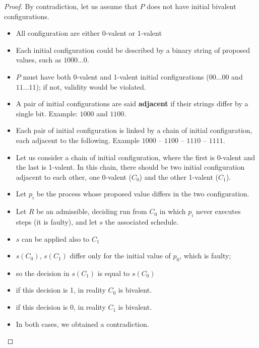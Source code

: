\documentclass[12pt]{article}
\newcommand{\BI}{\begin{itemize}}
\newcommand{\EI}{\end{itemize}}
\begin{document}
\begin{proof}
By contradiction, let us assume that $P$ does not have initial
bivalent configurations.

\BI
\item All configuration are either 0-valent or 1-valent

\item
Each initial configuration could be described by a binary string of proposed
values, such as $1000\ldots0$.

\item 
$P$ must have both 0-valent and 1-valent initial configurations ($00\ldots00$ and
$11\ldots11$); if not, validity would be violated.


\item 
A pair of initial configurations are said {\bf adjacent} if their strings differ
by a single bit. Example: $1000$ and $1100$.

\item
Each pair of initial configuration is linked by a chain of initial configuration, each adjacent
to the following. Example $1000$ -- $1100$ -- $1110$ -- $1111$.

\item Let us consider a chain of initial configuration, where the first is 
  0-valent and the last is 1-valent. In this chain, there should be
  two initial configuration adjacent to each other, one 0-valent ($C_0$) and 
  the other 1-valent ($C_1$).

\item Let $p_i$ be the process whose proposed value differs in the
  two configuration.

\item Let $R$ be an admissible, deciding run from $C_0$ in which
  $p_i$ never executes steps (it is faulty), and let $s$ the associated
  schedule.
\item $s$ can be applied also to $C_1$
\item $s(C_0)$, $s(C_1)$ differ only for the initial value of $p_0$,
  which is faulty; 
\item so the decision in $s(C_1)$ is equal to $s(C_0)$
\item if this decision is 1, in reality $C_0$ is bivalent.
\item if this decision is 0, in reality $C_1$ is bivalent.
\item In both cases, we obtained a contradiction.
\EI
\end{proof}

\newpage
\end{document}
